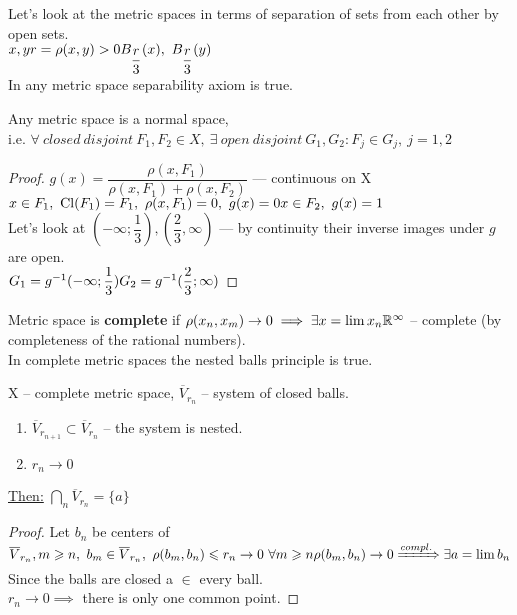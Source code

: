 Let's look at the metric spaces in terms of separation of sets from each other by open sets. \\
$x, y \\
r = \rho(x, y) > 0 \\
B_{\dfrac{r}{3}}(x),\ B_{\dfrac{r}{3}}(y)$ \\
In any metric space separability axiom is true.
\begin{thm}
  Any metric space is a normal space, \\i.e.
  $\forall\ closed\ disjoint\ F_1, F_2 \in X,\ \exists\ open\ disjoint\ G_1, G_2\colon F_j \in G_j,\ j = 1, 2$
\end{thm}
\begin{proof}
  $g(x) = \dfrac{\rho(x, F_1)}{\rho(x, F_1) + \rho(x, F_2)}$ --- continuous on X \\
  $x \in F_1,\ \operatorname{Cl}({F_1}) = F_1,\ \rho(x, F_1) = 0,\ g(x) = 0 \\
  x \in F_2,\ g(x) = 1$ \\
  Let's look at $(-\infty; \dfrac{1}{3}), (\dfrac{2}{3}, \infty)$ --- by continuity their inverse images under $g$ are open. \\
  $G_1 = g^{-1}(-\infty; \dfrac{1}{3}) \\
  G_2 = g^{-1}(\dfrac{2}{3}; \infty)$
\end{proof}
\begin{defn}
  Metric space is \textbf{complete} if $\rho(x_n, x_m) \to 0 \implies \exists x = \lim x_n \\
  \mathbb{R}^\infty$ -- complete (by completeness of the rational numbers). \\
  In complete metric spaces the nested balls principle is true.
\end{defn}
\begin{thm}
  X -- complete metric space, $\overline{V}_{r_n}$ -- system of closed balls.
  \begin{enumerate}
      \item $\overline{V}_{r_{n + 1}} \subset \overline{V}_{r_n}$ -- the system is nested.
      \item $r_n \to 0$
    \end{enumerate}
  \underline{Then:} $\bigcap\limits_n \overline{V}_{r_n} = \{a\}$
\end{thm}
\begin{proof}
  Let $b_n$ be centers of $\overline{V}_{r_n}, \\
  m \geq n,\ b_m \in \overline{V}_{r_n},\ \rho(b_m, b_n) \leq r_n \to 0\ \forall m \geq n \\
  \rho(b_m, b_n) \to 0 \xRightarrow{compl.} \exists a = \lim b_n$
  Since the balls are closed a $\in$ every ball. \\
  $r_n \to 0 \implies$ there is only one common point.
\end{proof}
